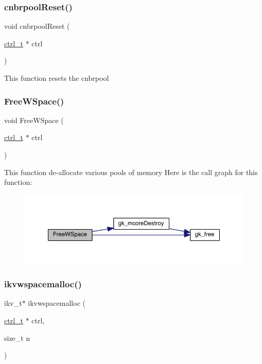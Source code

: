 \subsubsection{\texorpdfstring{cnbrpool\+Reset()}{cnbrpoolReset()}}
{\footnotesize\ttfamily void cnbrpool\+Reset (\begin{DoxyParamCaption}\item[{\hyperlink{a00742}{ctrl\+\_\+t} $\ast$}]{ctrl }\end{DoxyParamCaption})}

This function resets the cnbrpool \mbox{\label{a00984_a184692abde6fa16ba8d429796e888cd9}} 
\subsubsection{\texorpdfstring{Free\+W\+Space()}{FreeWSpace()}}
{\footnotesize\ttfamily void Free\+W\+Space (\begin{DoxyParamCaption}\item[{\hyperlink{a00742}{ctrl\+\_\+t} $\ast$}]{ctrl }\end{DoxyParamCaption})}

This function de-\/allocate various pools of memory Here is the call graph for this function\+:\nopagebreak
\begin{figure}[H]
\begin{center}
\leavevmode
\includegraphics[width=350pt]{a00984_a184692abde6fa16ba8d429796e888cd9_cgraph}
\end{center}
\end{figure}
\mbox{\label{a00984_accf7db8ecb7288f18eaf02d58cbb1244}} 
\subsubsection{\texorpdfstring{ikvwspacemalloc()}{ikvwspacemalloc()}}
{\footnotesize\ttfamily ikv\+\_\+t$\ast$ ikvwspacemalloc (\begin{DoxyParamCaption}\item[{\hyperlink{a00742}{ctrl\+\_\+t} $\ast$}]{ctrl,  }\item[{size\+\_\+t}]{n }\end{DoxyParamCaption})}

